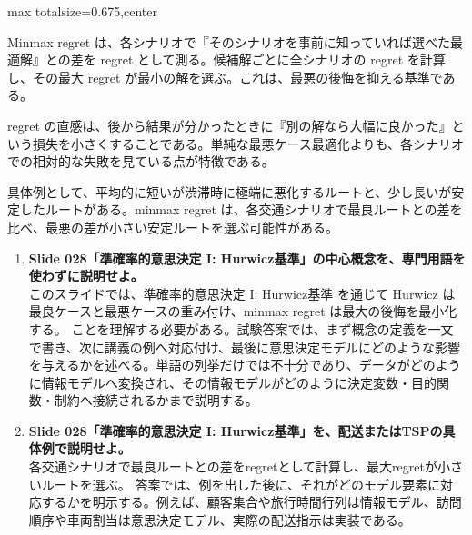 \begin{adjustbox}{max totalsize={\textwidth}{0.675\textheight},center}
\begin{minipage}{\textwidth}
\begin{minipage}[t]{0.485\textwidth}
Minmax regret は、各シナリオで『そのシナリオを事前に知っていれば選べた最適解』との差を regret として測る。候補解ごとに全シナリオの regret を計算し、その最大 regret が最小の解を選ぶ。これは、最悪の後悔を抑える基準である。\par
regret の直感は、後から結果が分かったときに『別の解なら大幅に良かった』という損失を小さくすることである。単純な最悪ケース最適化よりも、各シナリオでの相対的な失敗を見ている点が特徴である。\par
具体例として、平均的に短いが渋滞時に極端に悪化するルートと、少し長いが安定したルートがある。minmax regret は、各交通シナリオで最良ルートとの差を比べ、最悪の差が小さい安定ルートを選ぶ可能性がある。\par
{}
\begin{enumerate}
\item \textbf{Slide 028「準確率的意思決定 I: Hurwicz基準」の中心概念を、専門用語を使わずに説明せよ。}\\このスライドでは、準確率的意思決定 I: Hurwicz基準 を通じて Hurwicz は最良ケースと最悪ケースの重み付け、minmax regret は最大の後悔を最小化する。 ことを理解する必要がある。試験答案では、まず概念の定義を一文で書き、次に講義の例へ対応付け、最後に意思決定モデルにどのような影響を与えるかを述べる。単語の列挙だけでは不十分であり、データがどのように情報モデルへ変換され、その情報モデルがどのように決定変数・目的関数・制約へ接続されるかまで説明する。
\item \textbf{Slide 028「準確率的意思決定 I: Hurwicz基準」を、配送またはTSPの具体例で説明せよ。}\\各交通シナリオで最良ルートとの差をregretとして計算し、最大regretが小さいルートを選ぶ。 答案では、例を出した後に、それがどのモデル要素に対応するかを明示する。例えば、顧客集合や旅行時間行列は情報モデル、訪問順序や車両割当は意思決定モデル、実際の配送指示は実装である。
\end{enumerate}
\end{minipage}
\end{minipage}
\end{adjustbox}

